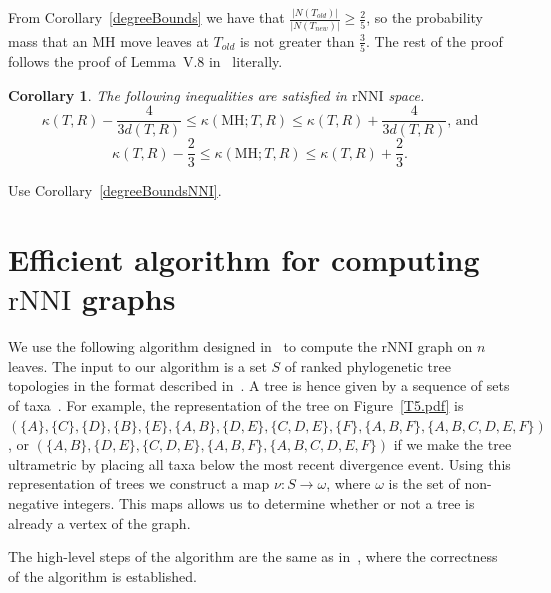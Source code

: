 \documentclass{amsart}
\newtheorem{corollary}[lemma]{Corollary}
\newcommand{\rnni}{\mathrm{rNNI}}
\newcommand{\MH}{\mathrm{MH}}
\begin{document}
\proof
From Corollary~\ref{degreeBounds} we have that $\frac{|N(T_{old})|}{|N(T_{new})|} \geq \frac{2}{5}$, so the probability mass that an MH move leaves at $T_{old}$ is not greater than $\frac35$.
The rest of the proof follows the proof of Lemma~V.8 in~\cite{Whidden2015-es} literally.
\endproof

\begin{corollary}
The following inequalities are satisfied in $\rnni$  space.
\[
\kappa(T,R) - \dfrac{4}{3d(T,R)} \leq \kappa(\MH;T,R) \leq \kappa(T,R) +
\dfrac{4}{3d(T,R)}\mbox{, and}
\]
\[
\kappa(T,R) - \dfrac23 \leq \kappa(\MH;T,R) \leq \kappa(T,R) + \dfrac23.
\]
\end{corollary}

\proof
Use Corollary~\ref{degreeBoundsNNI}.
\endproof

\section{Efficient algorithm for computing $\rnni$ graphs}

We use the following algorithm designed in~\cite{Whidden2015-es} to compute the $\rnni$ graph on $n$ leaves.
The input to our algorithm is a set $S$ of ranked phylogenetic tree topologies in the format described in~\cite{Semple2003-nj,Gavryushkin2014-bw}.
A tree is hence given by a sequence of sets of taxa~\cite{Gavryushkin2014-bw}.
For example, the representation of the tree on Figure~\ref{T5.pdf} is $(\{A\}, \{C\}, \{D\}, \{B\}, \{E\}, \{A,B\}, \{D,E\}, \{C, D, E\}, \{F\}, \{A,B,F\}, \{A,B,C,D,E,F\})$, or
$(\{A,B\}, \{D,E\}, \{C, D, E\}, \{A,B,F\}, \{A,B,C,D,E,F\})$ if we make the tree ultrametric by placing all taxa below the most recent divergence event.
Using this representation of trees we construct a map $\nu : S \to \omega$, where $\omega$ is the set of non-negative integers.
This maps allows us to determine whether or not a tree is already a vertex of the graph.

The high-level steps of the algorithm are the same as in~\cite{Whidden2015-es}, where the correctness of the algorithm is established.
\end{document}
